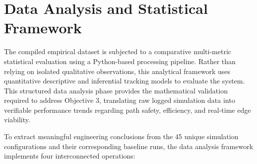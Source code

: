 \section{Data Analysis and Statistical Framework}

The compiled empirical dataset is subjected to a comparative multi-metric statistical evaluation
using a Python-based processing pipeline. Rather than relying on isolated qualitative observations,
this analytical framework uses quantitative descriptive and inferential tracking models to evaluate
the system. This structured data analysis phase provides the mathematical validation required to
address Objective 3, translating raw logged simulation data into verifiable performance trends
regarding path safety, efficiency, and real-time edge viability.

To extract meaningful engineering conclusions from the 45 unique simulation configurations and their
corresponding baseline runs, the data analysis framework implements four interconnected operations:

